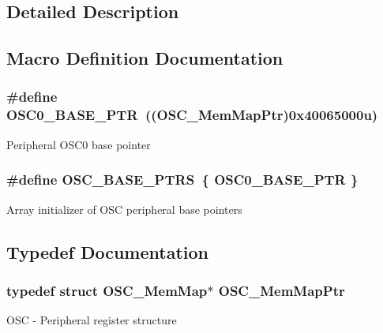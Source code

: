 \subsection{Detailed Description}


\subsection{Macro Definition Documentation}
\hypertarget{group___o_s_c___peripheral_gaab1618c69a91b2e5d3385139b5b566f0}{}
\subsubsection[{O\+S\+C0\+\_\+\+B\+A\+S\+E\+\_\+\+P\+T\+R}]{\setlength{\rightskip}{0pt plus 5cm}\#define O\+S\+C0\+\_\+\+B\+A\+S\+E\+\_\+\+P\+T\+R~(({\bf O\+S\+C\+\_\+\+Mem\+Map\+Ptr})0x40065000u)}\label{group___o_s_c___peripheral_gaab1618c69a91b2e5d3385139b5b566f0}
Peripheral O\+S\+C0 base pointer \hypertarget{group___o_s_c___peripheral_ga46f69fcb9d660e18b5cbf51adbbcec78}{}
\subsubsection[{O\+S\+C\+\_\+\+B\+A\+S\+E\+\_\+\+P\+T\+R\+S}]{\setlength{\rightskip}{0pt plus 5cm}\#define O\+S\+C\+\_\+\+B\+A\+S\+E\+\_\+\+P\+T\+R\+S~\{ {\bf O\+S\+C0\+\_\+\+B\+A\+S\+E\+\_\+\+P\+T\+R} \}}\label{group___o_s_c___peripheral_ga46f69fcb9d660e18b5cbf51adbbcec78}
Array initializer of O\+S\+C peripheral base pointers 

\subsection{Typedef Documentation}
\hypertarget{group___o_s_c___peripheral_gaaa685163f549fdf24c28ec9b400310b5}{}
\subsubsection[{O\+S\+C\+\_\+\+Mem\+Map\+Ptr}]{\setlength{\rightskip}{0pt plus 5cm}typedef struct {\bf O\+S\+C\+\_\+\+Mem\+Map}$\ast$ {\bf O\+S\+C\+\_\+\+Mem\+Map\+Ptr}}\label{group___o_s_c___peripheral_gaaa685163f549fdf24c28ec9b400310b5}
O\+S\+C -\/ Peripheral register structure 